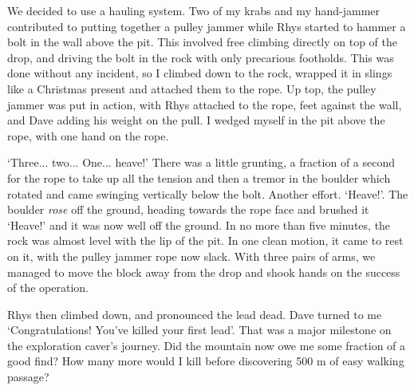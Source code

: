 	We decided to use a hauling system. Two of my krabs and my hand-jammer contributed to putting together a pulley jammer while Rhys started to hammer a bolt in the wall above the pit. This involved free climbing directly on top of the drop, and driving the bolt in the rock with only precarious footholds. This was done without any incident, so I climbed down to the rock, wrapped it in slings like a Christmas present and attached them to the rope. Up top, the pulley jammer was put in action, with Rhys attached to the rope, feet against the wall, and Dave adding his weight on the pull. I wedged myself in the pit above the rope, with one hand on the rope.

	`Three... two... One... heave!' There was a little grunting, a fraction of a second  for the rope to take up all the tension and then a tremor in the boulder which rotated and came swinging vertically below the bolt. Another effort. `Heave!'. The boulder \emph{rose} off the ground, heading towards the rope face and brushed it `Heave!' and it was now well off the ground. In no more than five minutes, the rock was almost level with the lip of the pit. In one clean motion, it came to rest on it, with the pulley jammer rope now slack. With three pairs of arms, we managed to move the block away from the drop and shook hands on the success of the operation.

	Rhys then climbed down, and pronounced the lead dead. Dave turned to me `Congratulations! You've killed your first lead'. That was a major milestone on the exploration caver's journey. Did the mountain now owe me some fraction of a good find? How many more would I kill before discovering 500 m of easy walking passage?

